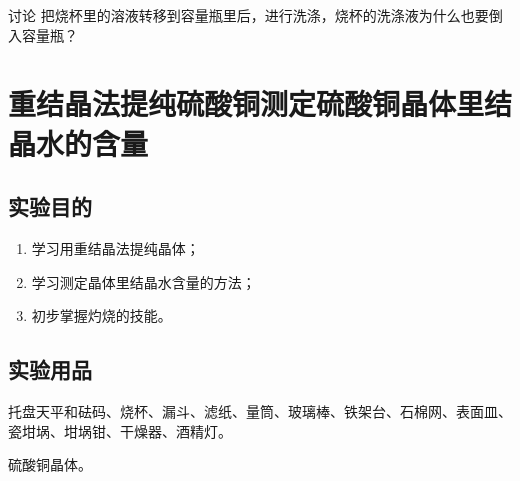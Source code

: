 \begin{Theorem}{讨论}
把烧杯里的溶液转移到容量瓶里后，进行洗涤，烧杯的洗涤液为什么也要倒入容量瓶？
\end{Theorem}

\section{重结晶法提纯硫酸铜\texorpdfstring{\quad}{ }测定硫酸铜晶体里结晶水的含量}
\subsection*{实验目的}
\begin{enumerate}[1.]
  \item 学习用重结晶法提纯晶体；
  \item 学习测定晶体里结晶水含量的方法；
  \item 初步掌握灼烧的技能。
\end{enumerate}
\subsection*{实验用品}
托盘天平和砝码、烧杯、漏斗、滤纸、量筒、玻璃棒、铁架台、石棉网、表面皿、瓷坩埚、坩埚钳、干燥器、酒精灯。

硫酸铜晶体。

